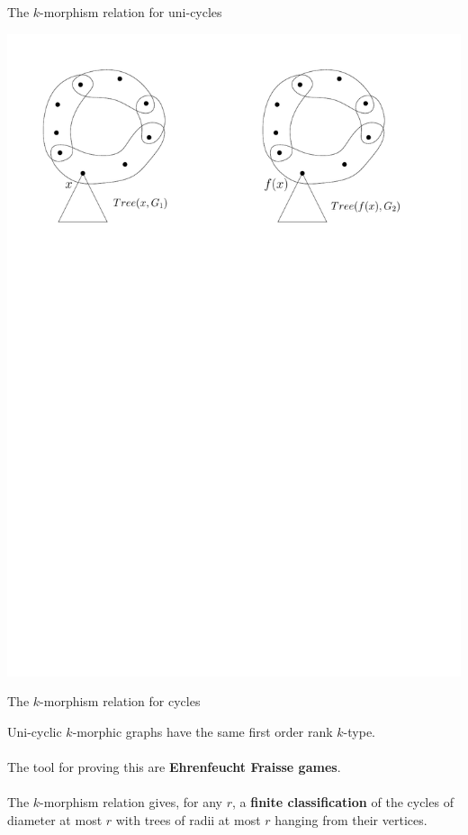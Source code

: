 \documentclass[11pt]{beamer}
\begin{document}
	\begin{frame}{The $k$-morphism relation for uni-cycles}
	\begin{center}
	\vspace{2.3em}
	\includegraphics[width=\linewidth]{KmorphicCycles3.pdf}
	\end{center}
	\end{frame}

	\begin{frame}{The $k$-morphism relation for cycles}
	
		Uni-cyclic $k$-morphic graphs have the same
		first order rank $k$-type.	\\~\\
		
		The tool for proving this are \textbf{Ehrenfeucht Fraisse games}.
		\\~\\
		
		The $k$-morphism relation gives, for any $r$, a \textbf{finite classification} of the cycles of diameter
		at most $r$ with trees of radii at most $r$ hanging from their vertices. 
		
	\end{frame}
\end{document}
